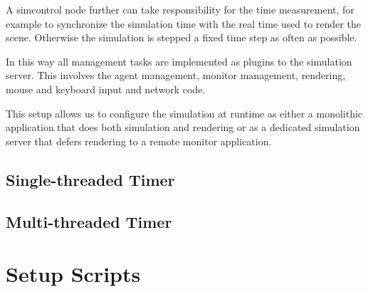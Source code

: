 A simcontrol node further can take responsibility for the time
measurement, for example to synchronize the simulation time with the
real time used to render the scene.  Otherwise the simulation is
stepped a fixed time step as often as possible.

In this way all management tasks are implemented as plugins to the
simulation server. This involves the agent management, monitor
management, rendering, mouse and keyboard input and network code.

This setup allows us to configure the simulation at runtime as either
a monolithic application that does both simulation and rendering or as
a dedicated simulation server that defers rendering to a remote
monitor application.



\subsection{Single-threaded Timer}

\subsection{Multi-threaded Timer}

\section{Setup Scripts}



